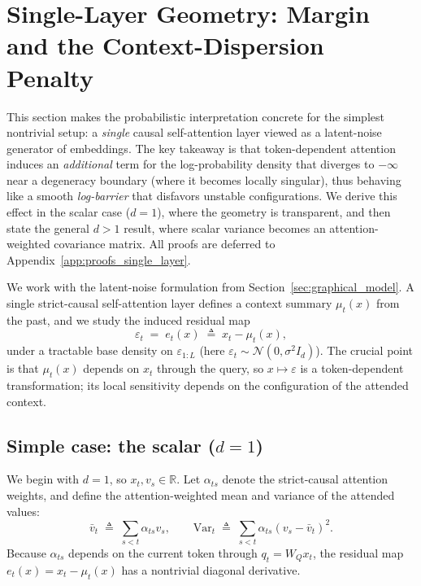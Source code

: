 \documentclass[11pt]{article}
\begin{document}
\section{Single-Layer Geometry: Margin and the Context-Dispersion Penalty}
\label{sec:single_layer_margin}

This section makes the probabilistic interpretation concrete for the simplest nontrivial setup: a \emph{single} causal self-attention layer viewed as a latent-noise generator of embeddings.
The key takeaway is that token-dependent attention induces an \emph{additional} term for the log-probability density that diverges to $-\infty$ near a degeneracy boundary (where it becomes locally singular), thus behaving like a smooth \emph{log-barrier} \citep{BoydVa04} that disfavors unstable configurations.
We derive this effect in the scalar case ($d=1$), where the geometry is transparent, and then state the general $d>1$ result, where scalar variance becomes an attention-weighted covariance matrix.
All proofs are deferred to Appendix~\ref{app:proofs_single_layer}.

We work with the latent-noise formulation from Section~\ref{sec:graphical_model}.
A single strict-causal self-attention layer defines a context summary $\mu_t(x)$ from the past, and we study the induced residual map
\begin{equation}
\varepsilon_t \;=\; e_t(x) \;\triangleq\; x_t - \mu_t(x),
\label{eq:residual_map_margin}
\end{equation}
under a tractable base density on $\varepsilon_{1:L}$ (here $\varepsilon_t \sim \mathcal{N}(0,\sigma^2 I_d)$).
The crucial point is that $\mu_t(x)$ depends on $x_t$ through the query, so $x\mapsto \varepsilon$ is a token-dependent transformation; its local sensitivity depends on the configuration of the attended context.

\subsection{Simple case: the scalar  (\texorpdfstring{$d=1$}{d=1})}
\label{subsec:scalar_case}

We begin with $d=1$, so $x_t,v_s\in\mathbb{R}$.
Let $\alpha_{ts}$ denote the strict-causal attention weights, and define the attention-weighted mean and variance of the attended values:
\begin{equation}
\bar v_t \;\triangleq\; \sum_{s<t}\alpha_{ts} v_s,
\qquad
\mathrm{Var}_t \;\triangleq\; \sum_{s<t}\alpha_{ts}(v_s-\bar v_t)^2.
\label{eq:scalar_var_def}
\end{equation}
Because $\alpha_{ts}$ depends on the current token through $q_t=W_Q x_t$, the residual map $e_t(x)=x_t-\mu_t(x)$ has a nontrivial diagonal derivative.
\end{document}
